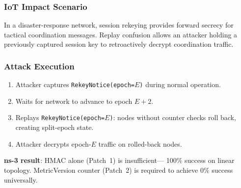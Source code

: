 \documentclass[10pt,journal,compsoc]{IEEEtran}
\begin{document}
\subsubsection{IoT Impact Scenario}
In a disaster-response network, session rekeying provides forward
secrecy for tactical coordination messages. Replay confusion
allows an attacker holding a previously captured session key to
retroactively decrypt coordination traffic.

\subsubsection{Attack Execution}
\begin{enumerate}
  \item Attacker captures \texttt{RekeyNotice(epoch=$E$)} during
    normal operation.
  \item Waits for network to advance to epoch $E{+}2$.
  \item Replays \texttt{RekeyNotice(epoch=$E$)}: nodes without
    counter checks roll back, creating split-epoch state.
  \item Attacker decrypts epoch-$E$ traffic on rolled-back nodes.
\end{enumerate}

\textbf{ns-3 result}: HMAC alone (Patch~1) is insufficient—
100\% success on linear topology. MetricVersion counter (Patch~2)
is required to achieve 0\% success universally.
\end{document}
